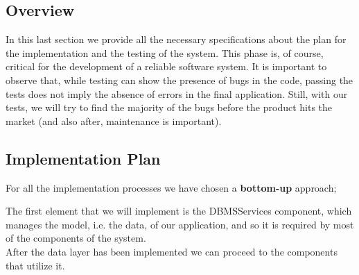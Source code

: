 \subsection{Overview}
In this last section we provide all the necessary specifications about the plan for the implementation and the testing of the system. This phase is, of course, critical for the development of a reliable software system. It is important to observe that, while testing can show the presence of bugs in the code, passing the tests does not imply the absence of errors in the final application. Still, with our tests, we will try to find the majority of the bugs before the product hits the market (and also after, maintenance is important).

\subsection{Implementation Plan}
For all the implementation processes we have chosen a \textbf{bottom-up} approach; %



The first element that we will implement is the DBMSServices component, which manages the model, i.e. the data, of our application, and so it is required by most of the components of the system.\\
After the data layer has been implemented we can proceed to the components that utilize it.
